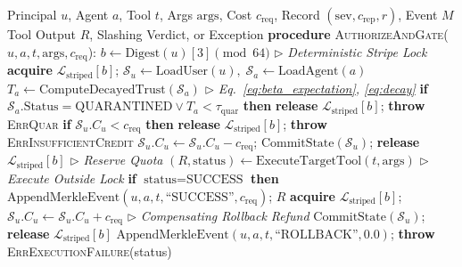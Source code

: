 \documentclass[journal]{IEEEtran}
\begin{document}
\begin{algorithm}[!t]
\caption{DualTrust Multi-Agent Governance Runtime Lifecycle}
\label{alg:lifecycle}
\label{alg:gate}
\label{alg:slashing}
\label{alg:merkle}
\footnotesize
\begin{algorithmic}[1]
\REQUIRE Principal $u$, Agent $a$, Tool $t$, Args $\text{args}$, Cost $c_{\text{req}}$, Record $(\text{sev}, c_{\text{rep}}, r)$, Event $M$
\ENSURE Tool Output $R$, Slashing Verdict, or Exception
\vspace{2pt}
\STATE \textbf{procedure} \textsc{AuthorizeAndGate}($u, a, t, \text{args}, c_{\text{req}}$):
\STATE \quad $b \leftarrow \text{Digest}(u)[3] \pmod{64}$ \hfill $\triangleright$ \textit{Deterministic Stripe Lock}
\STATE \quad \textbf{acquire} $\mathcal{L}_{\text{striped}}[b]$; \;\; $\mathcal{S}_u \leftarrow \text{LoadUser}(u), \; \mathcal{S}_a \leftarrow \text{LoadAgent}(a)$
\STATE \quad $T_a \leftarrow \text{ComputeDecayedTrust}(\mathcal{S}_a)$ \hfill $\triangleright$ \textit{Eq.~\eqref{eq:beta_expectation}, \eqref{eq:decay}}
\STATE \quad \textbf{if} $\mathcal{S}_a.\text{Status} = \text{QUARANTINED} \lor T_a < \tau_{\text{quar}}$ \textbf{then} \textbf{release} $\mathcal{L}_{\text{striped}}[b]$; \textbf{throw} \textsc{ErrQuar}
\STATE \quad \textbf{if} $\mathcal{S}_u.C_u < c_{\text{req}}$ \textbf{then} \textbf{release} $\mathcal{L}_{\text{striped}}[b]$; \textbf{throw} \textsc{ErrInsufficientCredit}
\STATE \quad $\mathcal{S}_u.C_u \leftarrow \mathcal{S}_u.C_u - c_{\text{req}}$; \;\; $\text{CommitState}(\mathcal{S}_u)$; \;\; \textbf{release} $\mathcal{L}_{\text{striped}}[b]$ \hfill $\triangleright$ \textit{Reserve Quota}
\STATE \quad $(R, \text{status}) \leftarrow \text{ExecuteTargetTool}(t, \text{args})$ \hfill $\triangleright$ \textit{Execute Outside Lock}
\STATE \quad \textbf{if} $\text{status} = \text{SUCCESS}$ \textbf{then} $\text{AppendMerkleEvent}(u, a, t, \text{``SUCCESS''}, c_{\text{req}})$; \RETURN $R$
\STATE \quad \textbf{acquire} $\mathcal{L}_{\text{striped}}[b]$; \;\; $\mathcal{S}_u.C_u \leftarrow \mathcal{S}_u.C_u + c_{\text{req}}$ \hfill $\triangleright$ \textit{Compensating Rollback Refund}
\STATE \quad $\text{CommitState}(\mathcal{S}_u)$; \;\; \textbf{release} $\mathcal{L}_{\text{striped}}[b]$
\STATE \quad $\text{AppendMerkleEvent}(u, a, t, \text{``ROLLBACK''}, 0.0)$; \;\; \textbf{throw} \textsc{ErrExecutionFailure}(status)


\end{algorithmic}
\end{algorithm}
\end{document}
